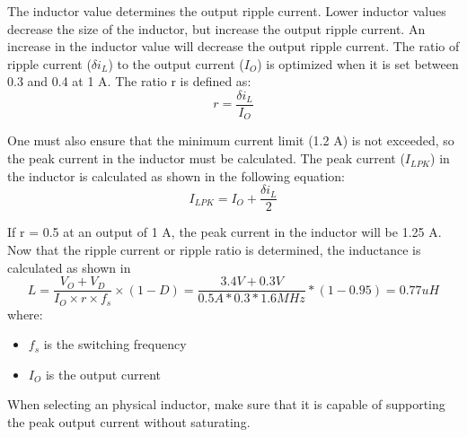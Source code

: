 \documentclass[./main.tex]{subfiles}
\begin{document}
The inductor value determines the output ripple current. Lower inductor values decrease the size of the inductor, but increase the output ripple current. An increase in the inductor value will decrease the output ripple current. The ratio of ripple current ($\delta i_L$) to the output current ($I_O$) is optimized when it is set between 0.3 and 0.4 at 1 A. The ratio r is defined as:
\begin{equation}
    r = \frac{\delta i_L}{I_O}
\end{equation}

One must also ensure that the minimum current limit (1.2 A) is not exceeded, so the peak current in the inductor must be calculated. The peak current ($I_{LPK}$) in the inductor is calculated as shown in the following equation:
\begin{equation}
    I_{LPK} = I_O + \frac{\delta i_L}{2}
\end{equation}

If r = 0.5 at an output of 1 A, the peak current in the inductor will be 1.25 A.
Now that the ripple current or ripple ratio is determined, the inductance is calculated as shown in 
\begin{equation}
    L = \frac{V_O + V_D}{I_O \times r \times f_s} \times (1-D)
    = \frac{3.4V + 0.3V}{0.5A * 0.3 * 1.6MHz} * (1-0.95) = 0.77uH
\end{equation}
where:
\begin{itemize}
    \item $f_s$ is the switching frequency
    \item $I_O$ is the output current
\end{itemize}
When selecting an physical inductor, make sure that it is capable of supporting the peak output current without saturating.
\end{document}
